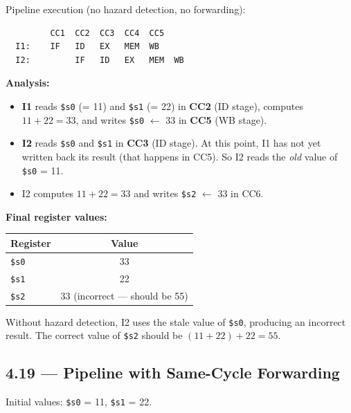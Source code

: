 Pipeline execution (no hazard detection, no forwarding):

\begin{verbatim}
         CC1  CC2  CC3  CC4  CC5
  I1:    IF   ID   EX   MEM  WB
  I2:         IF   ID   EX   MEM  WB
\end{verbatim}

\noindent\textbf{Analysis:}

\begin{itemize}
  \item \textbf{I1} reads \texttt{\$s0} (= 11) and \texttt{\$s1} (= 22) in
        \textbf{CC2} (ID stage), computes $11 + 22 = 33$, and writes
        \texttt{\$s0} $\leftarrow$ 33 in \textbf{CC5} (WB stage).
  \item \textbf{I2} reads \texttt{\$s0} and \texttt{\$s1} in \textbf{CC3}
        (ID stage). At this point, I1 has not yet written back its result
        (that happens in CC5). So I2 reads the \emph{old} value of
        \texttt{\$s0} = 11.
  \item I2 computes $11 + 22 = 33$ and writes \texttt{\$s2} $\leftarrow$ 33
        in CC6.
\end{itemize}

\noindent\textbf{Final register values:}

\begin{center}
\begin{tabular}{lc}
\toprule
\textbf{Register} & \textbf{Value} \\
\midrule
\texttt{\$s0} & 33 \\
\texttt{\$s1} & 22 \\
\texttt{\$s2} & 33 (incorrect --- should be 55) \\
\bottomrule
\end{tabular}
\end{center}

\noindent Without hazard detection, I2 uses the stale value of \texttt{\$s0},
producing an incorrect result. The correct value of \texttt{\$s2} should be
$(11+22) + 22 = 55$.

\subsection*{4.19 --- Pipeline with Same-Cycle Forwarding}
\hypertarget{sol-4.19}{}

Initial values: \texttt{\$s0} = 11, \texttt{\$s1} = 22.

